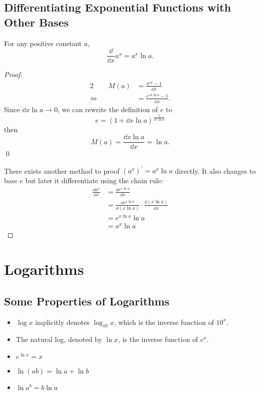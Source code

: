 \subsection{Differentiating Exponential Functions with Other Bases}
For any positive constant $a$,
\[\frac\dd{\dd x}a^x=a^x\ln a.\]
\begin{proof}
  \begin{alignat*}{2}
       && M(a) & =\frac{a^{\dd x}-1}{\dd x}\\
  \iff &&      & =\frac{e^{\dd x\ln a}-1}{\dd x}.
  \end{alignat*}
  Since $\dd x\ln a\to0$, we can rewrite the definition of $e$ to
  \[e=(1+\dd x\ln a)^\frac1{\dd x\ln a}\]
  then
  \[M(a)=\frac{\dd x\ln a}{\dd x}=\ln a.\]
  \hfill\qed

  There exists another method to proof $(a^x)^\prime=a^x\ln a$ directly. It also changes to base $e$ but later it differentiate using the chain rule:
  \begin{align*}
    \frac{\dd a^x}{\dd x} & =\frac{\dd e^{x\ln a}}{\dd x}\\
                          & =\frac{\dd e^{x\ln a}}{\dd(x\ln a)}\cdot\frac{\dd(x\ln a)}{\dd x}\\
                          & =e^{x\ln a}\ln a\\
                          & =a^x\ln a
  \end{align*}
\end{proof}

\section{Logarithms}
\subsection{Some Properties of Logarithms}
\begin{itemize}
\item$\log x$ implicitly denotes $\log_{10}x$, which is the inverse function of $10^x$.
\item The natural log, denoted by $\ln x$, is the inverse function of $e^x$.
\item$e^{\ln x}=x$
\item$\ln(ab)=\ln a+\ln b$
\item$\ln a^b=b\ln a$
\end{itemize}
